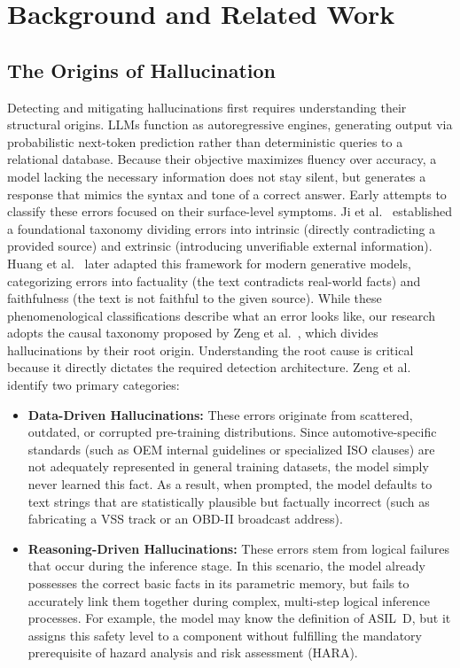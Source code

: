 \documentclass[conference,a4paper]{IEEEtran}
\begin{document}
\section{Background and Related Work}
\subsection{The Origins of Hallucination}
Detecting and mitigating hallucinations first requires understanding their structural origins. LLMs function as autoregressive engines, generating output via probabilistic next-token prediction rather than deterministic queries to a relational database. Because their objective maximizes fluency over accuracy, a model lacking the necessary information does not stay silent, but generates a response that mimics the syntax and tone of a correct answer.
Early attempts to classify these errors focused on their surface-level symptoms. Ji et al.~\cite{ref1} established a foundational taxonomy dividing errors into intrinsic (directly contradicting a provided source) and extrinsic (introducing unverifiable external information). Huang et al.~\cite{ref2} later adapted this framework for modern generative models, categorizing errors into factuality (the text contradicts real-world facts) and faithfulness (the text is not faithful to the given source).
While these phenomenological classifications describe what an error looks like, our research adopts the causal taxonomy proposed by Zeng et al.~\cite{ref14}, which divides hallucinations by their root origin. Understanding the root cause is critical because it directly dictates the required detection architecture. Zeng et al. identify two primary categories:
\begin{itemize}
    \item \textbf{Data-Driven Hallucinations:} These errors originate from scattered, outdated, or corrupted pre-training distributions. Since automotive-specific standards (such as OEM internal guidelines or specialized ISO clauses) are not adequately represented in general training datasets, the model simply never learned this fact. As a result, when prompted, the model defaults to text strings that are statistically plausible but factually incorrect (such as fabricating a VSS track or an OBD-II broadcast address).
    \item \textbf{Reasoning-Driven Hallucinations:}  These errors stem from logical failures that occur during the inference stage. In this scenario, the model already possesses the correct basic facts in its parametric memory, but fails to accurately link them together during complex, multi-step logical inference processes. For example, the model may know the definition of ASIL~D, but it assigns this safety level to a component without fulfilling the mandatory prerequisite of hazard analysis and risk assessment (HARA).
\end{itemize}
\end{document}
